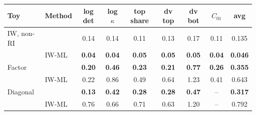 \begin{tabular}{llccccccc}
    \toprule
    Toy & Method & log det & log $\kappa$ & top share & dv top & dv bot & $C_{01}$ & avg \\
    \midrule
    IW, non-RI & \scsi{} & 0.14 & 0.14 & 0.11 & 0.13 & 0.17 & 0.11 & 0.135 \\
     & IW-ML & \textbf{0.04} & \textbf{0.04} & \textbf{0.05} & \textbf{0.05} & \textbf{0.05} & \textbf{0.04} & \textbf{0.046} \\
    \midrule
    Factor & \scsi{} & \textbf{0.20} & \textbf{0.46} & \textbf{0.23} & \textbf{0.21} & \textbf{0.77} & \textbf{0.26} & \textbf{0.355} \\
     & IW-ML & 0.22 & 0.86 & 0.49 & 0.64 & 1.23 & 0.41 & 0.643 \\
    \midrule
    Diagonal & \scsi{} & \textbf{0.13} & \textbf{0.42} & \textbf{0.28} & \textbf{0.28} & \textbf{0.47} & -- & \textbf{0.317} \\
     & IW-ML & 0.76 & 0.66 & 0.71 & 0.63 & 1.20 & -- & 0.792 \\
    \bottomrule
\end{tabular}
